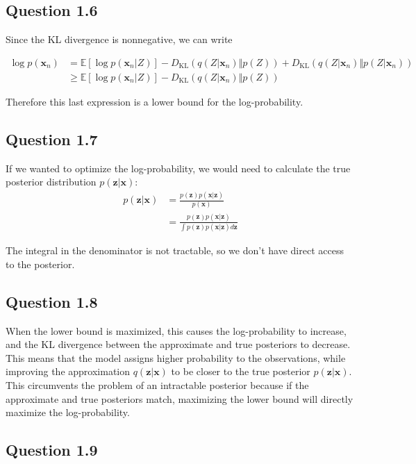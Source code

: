 \documentclass{article}
\begin{document}
\subsection*{Question 1.6}

Since the KL divergence is nonnegative, we can write

\begin{align*}
\log p(\mathbf{x}_n) &= \mathbb{E}[\log p(\mathbf{x}_n\vert Z)] - D_{\text{KL}}(q(Z\vert\mathbf{x}_n)\Vert p(Z)) + D_{\text{KL}}(q(Z\vert\mathbf{x}_n)\Vert p(Z\vert\mathbf{x}_n)) \\
&\geq \mathbb{E}[\log p(\mathbf{x}_n\vert Z)] - D_{\text{KL}}(q(Z\vert\mathbf{x}_n)\Vert p(Z))
\end{align*}

Therefore this last expression is a lower bound for the log-probability.

\subsection*{Question 1.7}

If we wanted to optimize the log-probability, we would need to calculate the true posterior distribution $p(\mathbf{z}\vert\mathbf{x})$:
\begin{align*}
p(\mathbf{z}\vert\mathbf{x}) &= \frac{p(\mathbf{z})p(\mathbf{x}\vert\mathbf{z})}{p(\mathbf{x})} \\
&= \frac{p(\mathbf{z})p(\mathbf{x}\vert\mathbf{z})}{\int p(\mathbf{z})p(\mathbf{x}\vert\mathbf{z})d\mathbf{z}}
\end{align*}

The integral in the denominator is not tractable, so we don't have direct access to the posterior.

\subsection*{Question 1.8}
When the lower bound is maximized, this causes the log-probability to increase, and the KL divergence between the approximate and true posteriors to decrease. This means that the model assigns higher probability to the observations, while improving the approximation $q(\mathbf{z}\vert\mathbf{x})$ to be closer to the true posterior $p(\mathbf{z}\vert\mathbf{x})$. This circumvents the problem of an intractable posterior because if the approximate and true posteriors match, maximizing the lower bound will directly maximize the log-probability.

\subsection*{Question 1.9}
\end{document}
